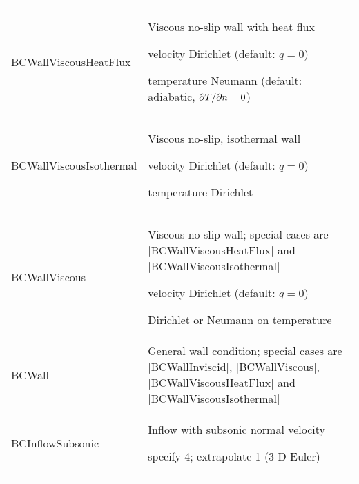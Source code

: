 \begin{longtable}{>{\ttfamily}p{\tmplengtha} >{\raggedright\arraybackslash}p{\Pwidth}}
BCWallViscousHeatFlux   & Viscous no-slip wall with heat flux
                          \begin{mylist}
                          \item velocity Dirichlet (default: $q = 0$)
                          \item temperature Neumann (default: adiabatic,
                                ${\partial T / \partial n} = 0$)
                          \end{mylist}\mbox{}\vspace{-0.5\baselineskip} \\

BCWallViscousIsothermal & Viscous no-slip, isothermal wall
                          \begin{mylist}
                          \item velocity Dirichlet (default: $q = 0$)
                          \item temperature Dirichlet
                          \end{mylist}\mbox{}\vspace{-0.5\baselineskip} \\

BCWallViscous           & Viscous no-slip wall; special cases are
                          |BCWallViscousHeatFlux| and
                          |BCWallViscousIsothermal|
                          \begin{mylist}
                          \item velocity Dirichlet (default: $q = 0$)
                          \item Dirichlet or Neumann on temperature
                          \end{mylist}\mbox{}\vspace{-0.5\baselineskip} \\

BCWall                  & General wall condition; special cases are
                          |BCWallInviscid|, |BCWallViscous|,
                          |BCWallViscousHeatFlux| and
                          |BCWallViscousIsothermal| \\[0.5\baselineskip]

BCInflowSubsonic        & Inflow with subsonic normal velocity
                          \begin{mylist}
                          \item specify 4; extrapolate 1 (3-D Euler)
                          \end{mylist}\mbox{}\vspace{-0.5\baselineskip} \\


\end{longtable}
